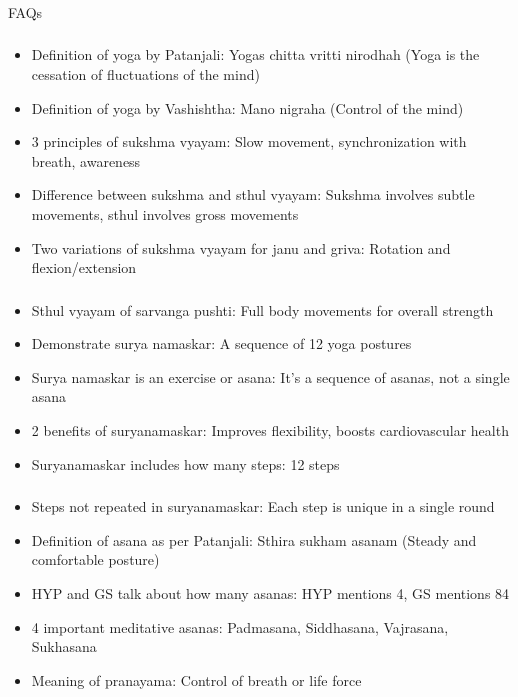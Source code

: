 \begin{frame}[fragile]\frametitle{}
\begin{center}
{\Large FAQs}
\end{center}
\end{frame}

\begin{frame}[fragile]\frametitle{}
\begin{itemize}
\item Definition of yoga by Patanjali: Yogas chitta vritti nirodhah (Yoga is the cessation of fluctuations of the mind)
\item Definition of yoga by Vashishtha: Mano nigraha (Control of the mind)
\item 3 principles of sukshma vyayam: Slow movement, synchronization with breath, awareness
\item Difference between sukshma and sthul vyayam: Sukshma involves subtle movements, sthul involves gross movements
\item Two variations of sukshma vyayam for janu and griva: Rotation and flexion/extension
\end{itemize}
\end{frame}

\begin{frame}[fragile]\frametitle{}
\begin{itemize}
\item Sthul vyayam of sarvanga pushti: Full body movements for overall strength
\item Demonstrate surya namaskar: A sequence of 12 yoga postures
\item Surya namaskar is an exercise or asana: It's a sequence of asanas, not a single asana
\item 2 benefits of suryanamaskar: Improves flexibility, boosts cardiovascular health
\item Suryanamaskar includes how many steps: 12 steps
\end{itemize}
\end{frame}

\begin{frame}[fragile]\frametitle{}
\begin{itemize}
\item Steps not repeated in suryanamaskar: Each step is unique in a single round
\item Definition of asana as per Patanjali: Sthira sukham asanam (Steady and comfortable posture)
\item HYP and GS talk about how many asanas: HYP mentions 4, GS mentions 84
\item 4 important meditative asanas: Padmasana, Siddhasana, Vajrasana, Sukhasana
\item Meaning of pranayama: Control of breath or life force
\end{itemize}
\end{frame}

